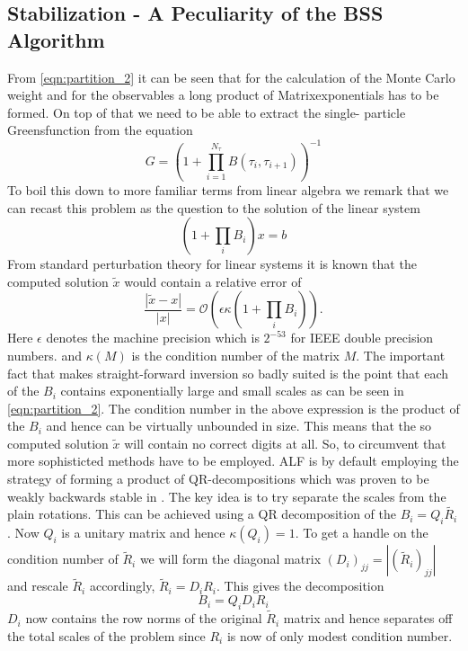 \subsection{Stabilization - A Peculiarity of the BSS Algorithm}
From \eqref{eqn:partition_2} it can be seen that for the calculation of the Monte Carlo weight
and for the observables a long product of Matrixexponentials has to be formed.
On top of that we need to be able to extract the single- particle Greensfunction from 
the equation 
\begin{equation}
G = \left( 1 + \prod_{i = 1}^{N_\tau} B(\tau_i, \tau_{i+1})\right)^{-1}
\end{equation}
To boil this down to more familiar terms from linear algebra we remark that we can recast this problem as the question to the solution of the linear system
\begin{equation}
(1 + \prod_i B_i) x = b
\end{equation}
From standard perturbation theory for linear systems it is known that the computed solution $\tilde{x}$ would 
contain a relative error of
\begin{equation}
\frac{|\tilde{x} - x|}{|x|} = \mathcal{O}\left(\epsilon \kappa(1 + \prod_i B_i)\right).
\end{equation}
Here $\epsilon$ denotes the machine precision which is $2^{-53}$ for IEEE double precision numbers.
and $\kappa(M)$ is the condition number of the matrix $M$.
The important fact that makes straight-forward inversion so badly suited is the point that
each of the $B_i$ contains exponentially large and small scales as can be seen in \eqref{eqn:partition_2}. The condition number in the above expression is the product of the $B_i$
and hence can be virtually unbounded in size. This means that the so computed solution $\tilde{x}$
will contain no correct digits at all.
So, to circumvent that more sophisticted methods have to be employed. ALF is by default employing
the strategy of forming a product of QR-decompositions which was proven to be weakly backwards stable in \cite{Bai2011}. The key idea is to try separate the scales from the plain rotations. This can be achieved using a QR decomposition of the $B_i = Q_i \tilde{R_i}$. Now $Q_i$ is a unitary matrix and hence $\kappa(Q_i) = 1$. To get a handle on the condition number of $\tilde{R}_i$ we will form the diagonal matrix $(D_i)_{jj} = |(\tilde{R}_i)_{jj}|$ and rescale $\tilde{R}_i$ accordingly, $\tilde{R}_i = D_i R_i$. This gives the decomposition
\begin{equation}
B_i = Q_i D_i R_i
\end{equation}
$D_i$ now contains the row norms of the original $\tilde{R}_i$ matrix and hence separates off the total scales of the problem since $R_i$ is now of only modest condition number.
